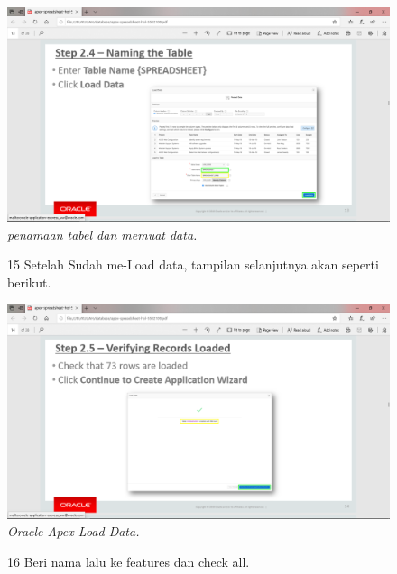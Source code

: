 \begin{enumerate}
\begin{figure}
    \begin{center}
\includegraphics[scale=0.3]{figures/pic(7).png}
    \caption{\textit{penamaan tabel dan memuat data.}}
        \end{center}
\label{gambar}
\end{figure}

\begin{figure}
\item[15] Setelah Sudah me-Load data, tampilan selanjutnya akan seperti berikut.

    \begin{center}
\includegraphics[scale=0.3]{figures/pic(8).png}
    \caption{\textit{Oracle Apex Load Data.}}
        \end{center}
\label{gambar}
\end{figure}

\begin{figure}
\item[16] Beri nama lalu ke features dan check all.


\end{figure}
\end{enumerate}
